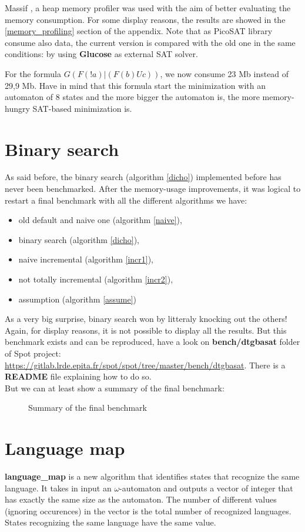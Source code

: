 Massif \cite{24}, a heap memory profiler was used with the aim of better evaluating the memory
consumption. For some display reasons, the results are showed in the \ref{memory_profiling}
section of the appendix. Note that as PicoSAT library consume also data, the current version is compared
with the old one in the same conditions: by using \textbf{Glucose} as external SAT solver.

For the formula $G(F(!a) | (F(b) U c))$, we now consume 23 Mb instead of 29,9 Mb. Have in mind that
this formula start the minimization with an automaton of 8 states and the more bigger the automaton is, the
more memory-hungry SAT-based minimization is.

\section{Binary search}
As said before, the binary search (algorithm \ref{dicho}) implemented before has never been benchmarked.
After the memory-usage improvements, it was logical to restart a final benchmark with all the different
algorithms we have:
\begin{itemize}
 \item old default and naive one (algorithm \ref{naive}),
 \item binary search (algorithm \ref{dicho}),
 \item naive incremental (algorithm \ref{incr1}),
 \item not totally incremental (algorithm \ref{incr2}),
 \item assumption (algorithm \ref{assume})
\end{itemize}

\noindent As a very big surprise, binary search won by litteraly knocking out the others! Again, for display
reasons, it is not possible to display all the results. But this benchmark exists and can be
reproduced, have a look on \textbf{bench/dtgbasat} folder of Spot project:
\url{https://gitlab.lrde.epita.fr/spot/spot/tree/master/bench/dtgbasat}. There is a \textbf{README} file
explaining how to do so.\\

But we can at least show a summary of the final benchmark:

\begin{figure}[H]
 \centering
 
 \caption{Summary of the final benchmark}
 \label{fig:final_bench_resume}
\end{figure}

\section{Language map}
\textbf{language\_map} is a new algorithm that identifies states that recognize the same language. 
It takes in input an $\omega$-automaton and outputs a vector of integer that has exactly the same
size as the automaton. The number of different values (ignoring occurences) in the vector is the
total number of recognized languages. States recognizing the same language have the same value.\\

